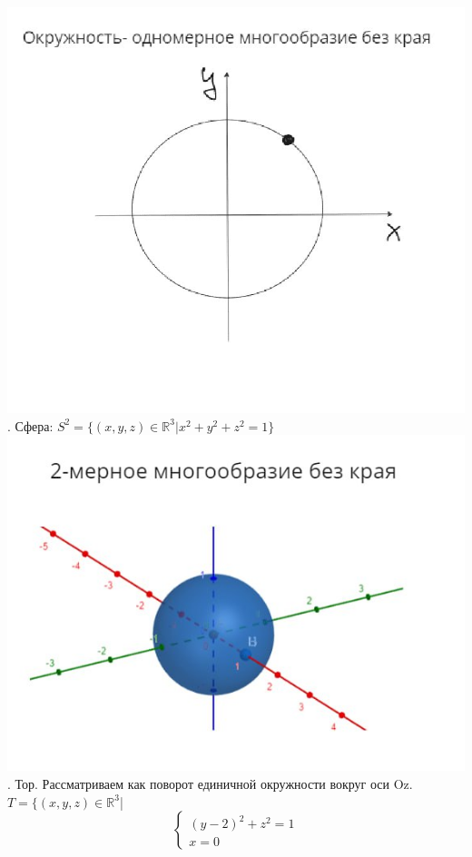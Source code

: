 \documentclass[12pt,a4paper]{article}
\begin{document}
\newline \includegraphics[scale=0.85]{image2.jpg}
. Сфера: \(S^2 = \{(x,y,z)\in\mathbb{R}^3| x^2+y^2+z^2=1\}\)
\newline \includegraphics[scale=0.5]{image3.jpg}
. Тор. Рассматриваем как поворот единичной окружности вокруг оси Oz.
\(T=\{(x,y,z)\in \mathbb{R}^3\)|
\begin{equation*}
\begin{cases}
(y - 2)^2 + z^2=1
\\
x =0
\end{cases}
\end{equation*}
\end{document}
